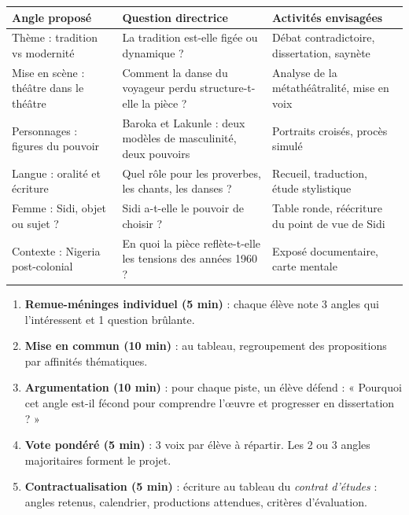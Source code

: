 \documentclass[11pt]{article}
\begin{document}
\begin{center}
\begin{tabularx}{\linewidth}{|l|X|X|}\hline
\rowcolor{popblueL}\textbf{Angle proposé} & \textbf{Question directrice} & \textbf{Activités envisagées} \\ \hline
Thème : tradition vs modernité & La tradition est-elle figée ou dynamique ? & Débat contradictoire, dissertation, saynète \\ \hline
Mise en scène : théâtre dans le théâtre & Comment la danse du voyageur perdu structure-t-elle la pièce ? & Analyse de la métathéâtralité, mise en voix \\ \hline
Personnages : figures du pouvoir & Baroka et Lakunle : deux modèles de masculinité, deux pouvoirs & Portraits croisés, procès simulé \\ \hline
Langue : oralité et écriture & Quel rôle pour les proverbes, les chants, les danses ? & Recueil, traduction, étude stylistique \\ \hline
Femme : Sidi, objet ou sujet ? & Sidi a-t-elle le pouvoir de choisir ? & Table ronde, réécriture du point de vue de Sidi \\ \hline
Contexte : Nigeria post-colonial & En quoi la pièce reflète-t-elle les tensions des années 1960 ? & Exposé documentaire, carte mentale \\ \hline
\end{tabularx}
\end{center}

\begin{methode}
\begin{enumerate}
    \item \textbf{Remue-méninges individuel (5 min)} : chaque élève note 3 angles qui l'intéressent et 1 question brûlante.
    \item \textbf{Mise en commun (10 min)} : au tableau, regroupement des propositions par affinités thématiques.
    \item \textbf{Argumentation (10 min)} : pour chaque piste, un élève défend : « Pourquoi cet angle est-il fécond pour comprendre l'œuvre et progresser en dissertation ? »
    \item \textbf{Vote pondéré (5 min)} : 3 voix par élève à répartir. Les 2 ou 3 angles majoritaires forment le projet.
    \item \textbf{Contractualisation (5 min)} : écriture au tableau du \emph{contrat d'études} : angles retenus, calendrier, productions attendues, critères d'évaluation.
\end{enumerate}
\end{methode}
\end{document}
